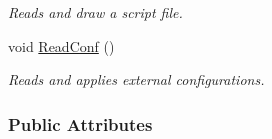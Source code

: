 \begin{DoxyCompactItemize}
\begin{DoxyCompactList}\small\item\em Reads and draw a script file. \end{DoxyCompactList}\item 
void \hyperlink{classDraw_a6f390f3a650790d32dd2860703f57e98}{Read\+Conf} ()\hypertarget{classDraw_a6f390f3a650790d32dd2860703f57e98}{}\label{classDraw_a6f390f3a650790d32dd2860703f57e98}

\begin{DoxyCompactList}\small\item\em Reads and applies external configurations. \end{DoxyCompactList}\end{DoxyCompactItemize}
\subsubsection*{Public Attributes}
